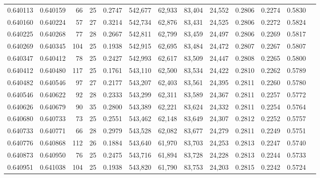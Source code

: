 \begin{tabular}{rrrrrrrrrrrrr}
0.640113 & 0.640159 &  66 &  25 &                                     0.2747 & 542,677 &  62,933 &  83,404 &  24,552 & 0.2806 & 0.2274 & 0.5830 \\
0.640160 & 0.640224 &  57 &  27 &                                     0.3214 & 542,734 &  62,876 &  83,431 &  24,525 & 0.2806 & 0.2272 & 0.5824 \\
0.640225 & 0.640268 &  77 &  28 &                                     0.2667 & 542,811 &  62,799 &  83,459 &  24,497 & 0.2806 & 0.2269 & 0.5817 \\
0.640269 & 0.640345 & 104 &  25 &                                     0.1938 & 542,915 &  62,695 &  83,484 &  24,472 & 0.2807 & 0.2267 & 0.5807 \\
0.640347 & 0.640412 &  78 &  25 &                                     0.2427 & 542,993 &  62,617 &  83,509 &  24,447 & 0.2808 & 0.2265 & 0.5800 \\
0.640412 & 0.640480 & 117 &  25 &                                     0.1761 & 543,110 &  62,500 &  83,534 &  24,422 & 0.2810 & 0.2262 & 0.5789 \\
0.640482 & 0.640546 &  97 &  27 &                                     0.2177 & 543,207 &  62,403 &  83,561 &  24,395 & 0.2811 & 0.2260 & 0.5780 \\
0.640546 & 0.640622 &  92 &  28 &                                     0.2333 & 543,299 &  62,311 &  83,589 &  24,367 & 0.2811 & 0.2257 & 0.5772 \\
0.640626 & 0.640679 &  90 &  35 &                                     0.2800 & 543,389 &  62,221 &  83,624 &  24,332 & 0.2811 & 0.2254 & 0.5764 \\
0.640680 & 0.640733 &  73 &  25 &                                     0.2551 & 543,462 &  62,148 &  83,649 &  24,307 & 0.2812 & 0.2252 & 0.5757 \\
0.640733 & 0.640771 &  66 &  28 &                                     0.2979 & 543,528 &  62,082 &  83,677 &  24,279 & 0.2811 & 0.2249 & 0.5751 \\
0.640776 & 0.640868 & 112 &  26 &                                     0.1884 & 543,640 &  61,970 &  83,703 &  24,253 & 0.2813 & 0.2247 & 0.5740 \\
0.640873 & 0.640950 &  76 &  25 &                                     0.2475 & 543,716 &  61,894 &  83,728 &  24,228 & 0.2813 & 0.2244 & 0.5733 \\
0.640951 & 0.641038 & 104 &  25 &                                     0.1938 & 543,820 &  61,790 &  83,753 &  24,203 & 0.2815 & 0.2242 & 0.5724 \\

\end{tabular}
